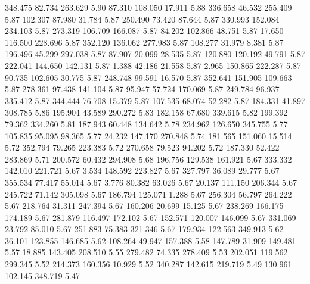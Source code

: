  348.475   82.734  263.629         5.90
  87.310  108.050   17.911         5.88
 336.658   46.532  255.409         5.87
 102.307   87.980   31.784         5.87
 250.490   73.420   87.644         5.87
 330.993  152.084  234.103         5.87
 273.319  106.709  166.087         5.87
  84.202  102.866   48.751         5.87
  17.650  116.500  228.696         5.87
 352.120  136.062  277.983         5.87
 108.277   31.979    8.381         5.87
 196.496   45.299  297.038         5.87
  87.907   20.099   28.535         5.87
 120.880  120.192   49.791         5.87
 222.041  144.650  142.131         5.87
   1.388   42.186   21.558         5.87
   2.965  150.865  222.287         5.87
  90.735  102.605   30.775         5.87
 248.748   99.591   16.570         5.87
 352.641  151.905  109.663         5.87
 278.361   97.438  141.104         5.87
  95.947   57.724  170.069         5.87
 249.784   96.937  335.412         5.87
 344.444   76.708   15.379         5.87
 107.535   68.074   52.282         5.87
 184.331   41.897  308.785         5.86
 195.904   43.589  290.272         5.83
 182.158   67.680  339.615         5.82
 199.392   79.362  334.260         5.81
 187.943   60.448  134.642         5.78
 234.962  126.650  345.755         5.77
 105.835   95.095   98.365         5.77
  24.232  147.170  270.848         5.74
 181.565  151.060   15.514         5.72
 352.794   79.265  223.383         5.72
 270.658   79.523   94.202         5.72
 187.330   52.422  283.869         5.71
 200.572   60.432  294.908         5.68
 196.756  129.538  161.921         5.67
 333.332  142.010  221.721         5.67
   3.534  148.592  223.827         5.67
 327.797   36.089   29.777         5.67
 355.534   77.417   55.014         5.67
   3.776   80.382   63.026         5.67
  20.137  111.150  206.344         5.67
 245.722   71.142  305.098         5.67
 186.794  125.071    1.288         5.67
 256.304   56.797  264.222         5.67
 218.764   31.311  247.394         5.67
 160.206   20.699   15.125         5.67
 238.269  166.175  174.189         5.67
 281.879  116.497  172.102         5.67
 152.571  120.007  146.099         5.67
 331.069   23.792   85.010         5.67
 251.883   75.383  321.346         5.67
 179.934  122.563  349.913         5.62
  36.101  123.855  146.685         5.62
 108.264   49.947  157.388         5.58
 147.789   31.909  149.481         5.57
  18.885  143.405  208.510         5.55
 279.482   74.335  278.409         5.53
 202.051  119.562  299.345         5.52
 214.373  160.356   10.929         5.52
 340.287  142.615  219.719         5.49
 130.961  102.145  348.719         5.47
